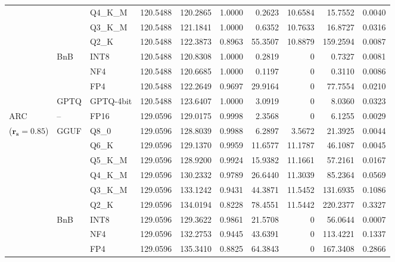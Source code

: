 \begin{longtable}{ll l rrrrrrr}
 &  & Q4\_K\_M & 120.5488 & 120.2865 & 1.0000 & 0.2623 & 10.6584 & 15.7552 & 0.0040 \\
 &  & Q3\_K\_M & 120.5488 & 121.1841 & 1.0000 & 0.6352 & 10.7633 & 16.8727 & 0.0316 \\
 &  & Q2\_K & 120.5488 & 122.3873 & \cellcolor{red!18} 0.8963 & \cellcolor{red!18} 55.3507 & 10.8879 & \cellcolor{red!18} 159.2594 & \cellcolor{red!18} 0.0087 \\
 & BnB & INT8 & 120.5488 & 120.8308 & 1.0000 & 0.2819 & \cellcolor{cyan!12} $0$ & 0.7327 & 0.0081 \\
 &  & NF4 & 120.5488 & 120.6685 & 1.0000 & 0.1197 & \cellcolor{cyan!12} $0$ & 0.3110 & 0.0086 \\
 &  & FP4 & 120.5488 & 122.2649 & 0.9697 & 29.9164 & \cellcolor{cyan!12} $0$ & 77.7554 & 0.0210 \\
 & GPTQ & GPTQ-4bit & 120.5488 & 123.6407 & 1.0000 & 3.0919 & \cellcolor{cyan!12} $0$ & 8.0360 & 0.0323 \\
\midrule
ARC & -- & FP16 & 129.0596 & 129.0175 & 0.9998 & 2.3568 & \cellcolor{cyan!12} $0$ & 6.1255 & 0.0029 \\
{\small ($\mathbf{r_s{=}0.85}$)} & GGUF & Q8\_0 & 129.0596 & 128.8039 & 0.9988 & 6.2897 & 3.5672 & 21.3925 & 0.0044 \\
 &  & Q6\_K & 129.0596 & 129.1370 & 0.9959 & 11.6577 & 11.1787 & 46.1087 & 0.0045 \\
 &  & Q5\_K\_M & 129.0596 & 128.9200 & 0.9924 & 15.9382 & 11.1661 & 57.2161 & 0.0167 \\
 &  & Q4\_K\_M & 129.0596 & 130.2332 & 0.9789 & 26.6440 & 11.3039 & 85.2364 & 0.0569 \\
 &  & Q3\_K\_M & 129.0596 & 133.1242 & \cellcolor{red!18} 0.9431 & \cellcolor{red!18} 44.3871 & 11.5452 & \cellcolor{red!18} 131.6935 & \cellcolor{red!18} 0.1086 \\
 &  & Q2\_K & 129.0596 & 134.0194 & \cellcolor{red!18} 0.8228 & \cellcolor{red!18} 78.4551 & 11.5442 & \cellcolor{red!18} 220.2377 & \cellcolor{red!18} 0.3327 \\
 & BnB & INT8 & 129.0596 & 129.3622 & 0.9861 & 21.5708 & \cellcolor{cyan!12} $0$ & 56.0644 & 0.0007 \\
 &  & NF4 & 129.0596 & 132.2753 & \cellcolor{red!18} 0.9445 & \cellcolor{red!18} 43.6391 & \cellcolor{cyan!12} $0$ & \cellcolor{red!18} 113.4221 & \cellcolor{red!18} 0.1337 \\
 &  & FP4 & 129.0596 & 135.3410 & \cellcolor{red!18} 0.8825 & \cellcolor{red!18} 64.3843 & \cellcolor{cyan!12} $0$ & \cellcolor{red!18} 167.3408 & \cellcolor{red!18} 0.2866 \\

\end{longtable}
